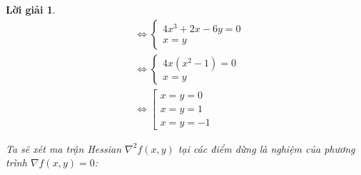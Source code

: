 \documentclass[14pt, a4paper]{article}
\theoremstyle{sltheorem}
\theoremstyle{soltheorem}
\newtheorem*{loigiai}{Lời giải}
\begin{document}
\begin{loigiai}
        \begin{equation}
            \begin{aligned}
            &\Leftrightarrow \begin{cases} 4x^3 + 2x - 6y = 0 \\ x = y \end{cases} \\
            &\Leftrightarrow \begin{cases} 4x(x^2-1) = 0 \\ x = y \end{cases} \\
            &\Leftrightarrow \left [\begin{array}{l} x=y=0 \\ x=y=1 \\ x=y=-1 \end{array}\right.
            \end{aligned}
        \end{equation}

        Ta sẽ xét ma trận Hessian $\nabla^2 f(x,y)$ tại các điểm dừng là nghiệm của phương trình $\nabla f(x, y) = 0$:


\end{loigiai}
\end{document}

